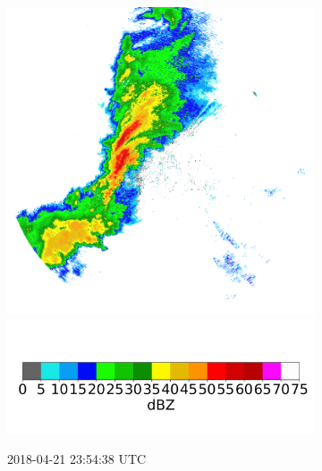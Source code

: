 \begin{figure}[h]
\begin{subfigure}[b]{0.3\textwidth}
		\includegraphics[width=\textwidth]{./thesis_code/plots/midlothian.tx-20180421-235438-ref.png}
		\includegraphics[width=\textwidth]{./thesis_code/plots/dfw_colormap.png}
		\caption{2018-04-21 23:54:38 UTC}
		\label{fig:bestmodel_translation5}
	\end{subfigure}
	\begin{subfigure}[b]{0.3\textwidth}

\end{subfigure}
\end{figure}
